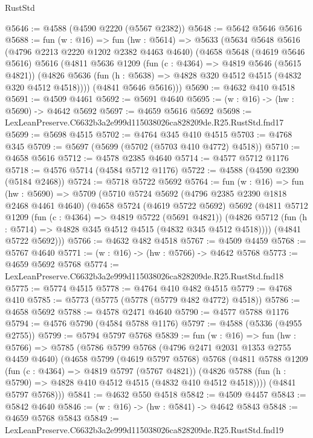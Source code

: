 \begin{lexlean}{RustStd}
\begin{coremodule}
@5646 := @4588 (@4590 @2220 (@5567 @2382))
@5648 := @5642 @5646 @5616
@5688 := fun (w : @16) =>
  fun (hw : @5614) =>
  @5633
    (@5634
      @5648
      @5616
      (@4796 @2213 @2220 @1202 @2382 @4463 @4640)
      (@4658
        @5648
        (@4619 @5646 @5616)
        @5616
        (@4811
          @5636
          @1209
          (fun (c : @4364) => @4819 @5646 (@5615 @4821))
          (@4826 @5636 (fun (h : @5638) => @4828 @320 @4512 @4515 (@4832 @320 @4512 @4518))))
        (@4841 @5646 @5616)))
@5690 := @4632 @410 @4518
@5691 := @4509 @4461
@5692 := @5691 @4640
@5695 := (w : @16) -> (hw : @5690) -> @4642 @5692
@5697 := @4659 @5616 @5692
@5698 := LexLeanPreserve.C6632b3a2e999d115038026ca828209de.R25.RustStd.fnd17
@5699 := @5698 @4515
@5702 := @4764 @345 @410 @4515
@5703 := @4768 @345
@5709 := @5697 (@5699 (@5702 (@5703 @410 @4772) @4518))
@5710 := @4658 @5616
@5712 := @4578 @2385 @4640
@5714 := @4577 @5712 @1176
@5718 := @4576 @5714 (@4584 @5712 @1176)
@5722 := @4588 (@4590 @2390 (@5184 @2468))
@5724 := @5718 @5722 @5692
@5764 := fun (w : @16) =>
  fun (hw : @5690) =>
  @5709
    (@5710
      @5724
      @5692
      (@4796 @2385 @2390 @1818 @2468 @4461 @4640)
      (@4658
        @5724
        (@4619 @5722 @5692)
        @5692
        (@4811
          @5712
          @1209
          (fun (c : @4364) => @4819 @5722 (@5691 @4821))
          (@4826 @5712 (fun (h : @5714) => @4828 @345 @4512 @4515 (@4832 @345 @4512 @4518))))
        (@4841 @5722 @5692)))
@5766 := @4632 @482 @4518
@5767 := @4509 @4459
@5768 := @5767 @4640
@5771 := (w : @16) -> (hw : @5766) -> @4642 @5768
@5773 := @4659 @5692 @5768
@5774 := LexLeanPreserve.C6632b3a2e999d115038026ca828209de.R25.RustStd.fnd18
@5775 := @5774 @4515
@5778 := @4764 @410 @482 @4515
@5779 := @4768 @410
@5785 := @5773 (@5775 (@5778 (@5779 @482 @4772) @4518))
@5786 := @4658 @5692
@5788 := @4578 @2471 @4640
@5790 := @4577 @5788 @1176
@5794 := @4576 @5790 (@4584 @5788 @1176)
@5797 := @4588 (@5336 (@4955 @2755))
@5799 := @5794 @5797 @5768
@5839 := fun (w : @16) =>
  fun (hw : @5766) =>
  @5785
    (@5786
      @5799
      @5768
      (@4796 @2471 @2031 @1353 @2755 @4459 @4640)
      (@4658
        @5799
        (@4619 @5797 @5768)
        @5768
        (@4811
          @5788
          @1209
          (fun (c : @4364) => @4819 @5797 (@5767 @4821))
          (@4826 @5788 (fun (h : @5790) => @4828 @410 @4512 @4515 (@4832 @410 @4512 @4518))))
        (@4841 @5797 @5768)))
@5841 := @4632 @550 @4518
@5842 := @4509 @4457
@5843 := @5842 @4640
@5846 := (w : @16) -> (hw : @5841) -> @4642 @5843
@5848 := @4659 @5768 @5843
@5849 := LexLeanPreserve.C6632b3a2e999d115038026ca828209de.R25.RustStd.fnd19

\end{coremodule}
\end{lexlean}
